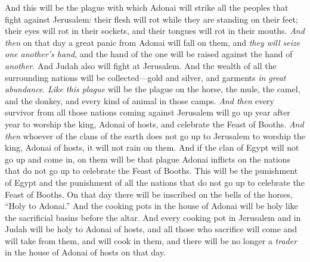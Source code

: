 \begin{biblechapter}
\verse And this will be the plague with which Adonai will strike all the peoples that fight against Jerusalem: their flesh will rot while they are standing on their feet; their eyes will rot in their sockets, and their tongues will rot in their mouths.
\verse \textit{And then} on that day a great panic from Adonai will fall on them, and \textit{they will seize one another’s hand}, and the hand of the one will be raised against the hand of \textit{another}.
\verse And Judah also will fight at Jerusalem. And the wealth of all the surrounding nations will be collected—gold and silver, and garments \textit{in great abundance}.
\verse \textit{Like this plague} will be the plague on the horse, the mule, the camel, and the donkey, and every kind of animal in those camps.
\verse \textit{And then} every survivor from all those nations coming against Jerusalem will go up year after year to worship the king, Adonai of hosts, and celebrate the Feast of Booths.
\verse \textit{And then} whoever of the clans of the earth does not go up to Jerusalem to worship the king, Adonai of hosts, it will not rain on them.
\verse And if the clan of Egypt will not go up and come in, on them will be that plague Adonai inflicts on the nations that do not go up to celebrate the Feast of Booths.
\verse This will be the punishment of Egypt and the punishment of all the nations that do not go up to celebrate the Feast of Booths.
\verse On that day there will be inscribed on the bells of the horses, “Holy to Adonai.” And the cooking pots in the house of Adonai will be holy like the sacrificial basins before the altar.
\verse And every cooking pot in Jerusalem and in Judah will be holy to Adonai of hosts, and all those who sacrifice will come and will take from them, and will cook in them, and there will be no longer a \textit{trader} in the house of Adonai of hosts on that day.
\end{biblechapter}

